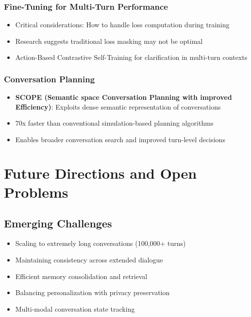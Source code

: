 \documentclass[11pt,letterpaper]{article}
\begin{document}
\subsubsection{Fine-Tuning for Multi-Turn Performance}
\begin{itemize}[leftmargin=*]
    \item Critical considerations: How to handle loss computation during training
    \item Research suggests traditional loss masking may not be optimal
    \item Action-Based Contrastive Self-Training for clarification in multi-turn contexts
\end{itemize}

\subsubsection{Conversation Planning}
\begin{itemize}[leftmargin=*]
    \item \textbf{SCOPE (Semantic space Conversation Planning with improved Efficiency)}: Exploits dense semantic representation of conversations
    \item 70x faster than conventional simulation-based planning algorithms
    \item Enables broader conversation search and improved turn-level decisions
\end{itemize}

\section{Future Directions and Open Problems}

\subsection{Emerging Challenges}
\begin{itemize}[leftmargin=*]
    \item Scaling to extremely long conversations (100,000+ turns)
    \item Maintaining consistency across extended dialogue
    \item Efficient memory consolidation and retrieval
    \item Balancing personalization with privacy preservation
    \item Multi-modal conversation state tracking
\end{itemize}
\end{document}
